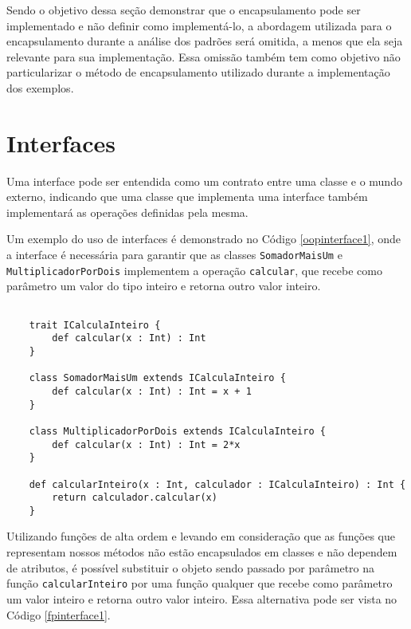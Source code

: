 Sendo o objetivo dessa seção demonstrar que 
o encapsulamento pode ser implementado e 
não definir como implementá-lo, 
a abordagem utilizada para o encapsulamento 
durante a análise dos padrões será 
omitida, a menos que ela seja relevante para 
sua implementação. Essa omissão 
também tem como objetivo não particularizar o 
método de encapsulamento utilizado durante a 
implementação dos exemplos.

\section{Interfaces}

Uma interface pode ser entendida como um contrato 
entre uma classe e o mundo externo, indicando que 
uma classe que implementa uma interface também 
implementará as operações definidas 
pela mesma\cite{oracleooconcepts}. 

Um exemplo do uso de interfaces é demonstrado no Código 
\ref{oopinterface1}, 
onde a interface é necessária para garantir que as 
classes \texttt{SomadorMaisUm} e \texttt{MultiplicadorPorDois} 
implementem 
a operação \texttt{calcular}, que recebe como parâmetro 
um valor do tipo inteiro e retorna outro valor 
inteiro.


\begin{lstlisting}[caption={Interfaces em Orientação a Objetos.},label=oopinterface1]
    
    trait ICalculaInteiro {
        def calcular(x : Int) : Int
    }

    class SomadorMaisUm extends ICalculaInteiro {
        def calcular(x : Int) : Int = x + 1
    }

    class MultiplicadorPorDois extends ICalculaInteiro {
        def calcular(x : Int) : Int = 2*x
    }

    def calcularInteiro(x : Int, calculador : ICalculaInteiro) : Int {
        return calculador.calcular(x)
    }

\end{lstlisting}

Utilizando funções de alta ordem e levando em 
consideração que as funções que representam nossos 
métodos não estão encapsulados em classes e 
não dependem de atributos, é possível substituir o 
objeto sendo passado por parâmetro na função 
\texttt{calcularInteiro} por uma função qualquer que recebe 
como parâmetro um valor inteiro e retorna outro 
valor inteiro. Essa alternativa pode ser vista 
no Código \ref{fpinterface1}.

